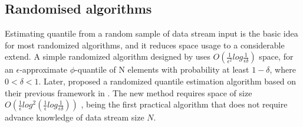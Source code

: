 \subsection{Randomised algorithms}
\label{randomised}


Estimating quantile from a random sample of data stream input is the basic idea for most randomized algorithms, and it reduces space usage to a considerable extend.
A simple randomized algorithm designed by \citeauthor{floydExpectedTimeBounds1975}\cite{floydExpectedTimeBounds1975} uses $O(\frac{1}{\epsilon^2} log \frac{1}{\epsilon \delta})$ space, for an $\epsilon$-approximate $\phi$-quantile of N elements with probability at least $1 - \delta$, where $0 < \delta < 1$.
Later, \citeauthor{mankuRandomSamplingTechniques}\cite{mankuRandomSamplingTechniques} proposed a randomized quantile estimation algorithm based on their previous framework in \cite{mankuApproximateMediansOthera}. The new method requires space of size 
$O(
    \frac{1}{\epsilon} log^2 
    (\frac{1}{\epsilon} 
        log \frac{1}{\epsilon \delta}
    )
)
$
, being the first practical algorithm that does not require advance knowledge of data stream size $N$.

